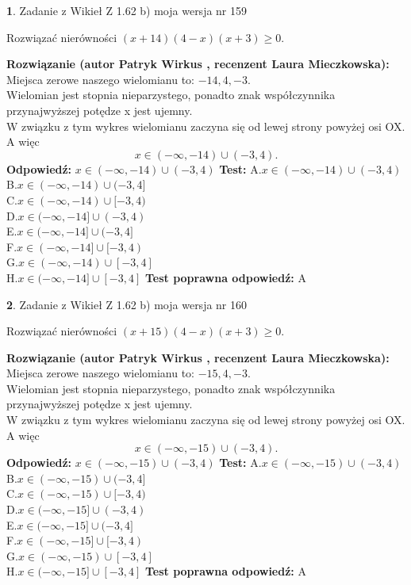 \documentclass[12pt, a4paper]{article}
\theoremstyle{definition} %
\newtheorem{zad}{}
\newcommand{\zadStart}[1]{\begin{zad}#1\newline}
\newcommand{\zadStop}{\end{zad}}
\newcommand{\rozwStart}[2]{\noindent \textbf{Rozwiązanie (autor #1 , recenzent #2): }\newline}
\newcommand{\rozwStop}{\newline}
\newcommand{\odpStart}{\noindent \textbf{Odpowiedź:}\newline}
\newcommand{\odpStop}{\newline}
\newcommand{\testStart}{\noindent \textbf{Test:}\newline}
\newcommand{\testStop}{\newline}
\newcommand{\kluczStart}{\noindent \textbf{Test poprawna odpowiedź:}\newline}
\newcommand{\kluczStop}{\newline}
\begin{document}
\zadStart{Zadanie z Wikieł Z 1.62 b) moja wersja nr 159}

Rozwiązać nierówności $(x+14)(4-x)(x+3)\ge0$.
\zadStop
\rozwStart{Patryk Wirkus}{Laura Mieczkowska}
Miejsca zerowe naszego wielomianu to: $-14, 4, -3$.\\
Wielomian jest stopnia nieparzystego, ponadto znak współczynnika przy\linebreak najwyższej potędze x jest ujemny.\\ W związku z tym wykres wielomianu zaczyna się od lewej strony powyżej osi OX. A więc $$x \in (-\infty,-14) \cup (-3,4).$$
\rozwStop
\odpStart
$x \in (-\infty,-14) \cup (-3,4)$
\odpStop
\testStart
A.$x \in (-\infty,-14) \cup (-3,4)$\\
B.$x \in (-\infty,-14) \cup (-3,4]$\\
C.$x \in (-\infty,-14) \cup [-3,4)$\\
D.$x \in (-\infty,-14] \cup (-3,4)$\\
E.$x \in (-\infty,-14] \cup (-3,4]$\\
F.$x \in (-\infty,-14] \cup [-3,4)$\\
G.$x \in (-\infty,-14) \cup [-3,4]$\\
H.$x \in (-\infty,-14] \cup [-3,4]$
\testStop
\kluczStart
A
\kluczStop



\zadStart{Zadanie z Wikieł Z 1.62 b) moja wersja nr 160}

Rozwiązać nierówności $(x+15)(4-x)(x+3)\ge0$.
\zadStop
\rozwStart{Patryk Wirkus}{Laura Mieczkowska}
Miejsca zerowe naszego wielomianu to: $-15, 4, -3$.\\
Wielomian jest stopnia nieparzystego, ponadto znak współczynnika przy\linebreak najwyższej potędze x jest ujemny.\\ W związku z tym wykres wielomianu zaczyna się od lewej strony powyżej osi OX. A więc $$x \in (-\infty,-15) \cup (-3,4).$$
\rozwStop
\odpStart
$x \in (-\infty,-15) \cup (-3,4)$
\odpStop
\testStart
A.$x \in (-\infty,-15) \cup (-3,4)$\\
B.$x \in (-\infty,-15) \cup (-3,4]$\\
C.$x \in (-\infty,-15) \cup [-3,4)$\\
D.$x \in (-\infty,-15] \cup (-3,4)$\\
E.$x \in (-\infty,-15] \cup (-3,4]$\\
F.$x \in (-\infty,-15] \cup [-3,4)$\\
G.$x \in (-\infty,-15) \cup [-3,4]$\\
H.$x \in (-\infty,-15] \cup [-3,4]$
\testStop
\kluczStart
A
\kluczStop
\end{document}
